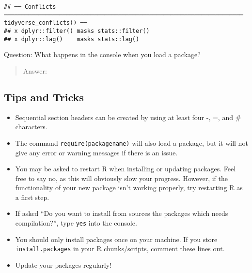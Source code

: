 \documentclass[]{article}
\begin{document}
\begin{verbatim}
## ── Conflicts ───────────────────────────────────────────────────────────────────── tidyverse_conflicts() ──
## x dplyr::filter() masks stats::filter()
## x dplyr::lag()    masks stats::lag()
\end{verbatim}

Question: What happens in the console when you load a package?

\begin{quote}
Answer:
\end{quote}

\subsection{Tips and Tricks}\label{tips-and-tricks}

\begin{itemize}
\item
  Sequential section headers can be created by using at least four -, =,
  and \# characters.
\item
  The command \texttt{require(packagename)} will also load a package,
  but it will not give any error or warning messages if there is an
  issue.
\item
  You may be asked to restart R when installing or updating packages.
  Feel free to say no, as this will obviously slow your progress.
  However, if the functionality of your new package isn't working
  properly, try restarting R as a first step.
\item
  If asked ``Do you want to install from sources the packages which
  needs compilation?'', type \texttt{yes} into the console.
\item
  You should only install packages once on your machine. If you store
  \texttt{install.packages} in your R chunks/scripts, comment these
  lines out.
\item
  Update your packages regularly!
\end{itemize}
\end{document}
